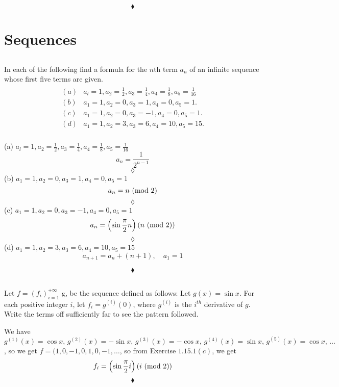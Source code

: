 $$\blacklozenge$$
\newpage
 \section{Sequences}
\subsection{}
\begin{tcolorbox}
In each of the following find a formula for the $n$th term $a_n$ of an infinite sequence whose first five terms are given. 
\begin{align*}
\begin{matrix}
(a)& a_l = 1, a_2 = \frac{1}{2}, a_3 = \frac{1}{4}, a_4 = \frac{1}{8}, a_5 =\frac{1}{16} \\
(b)& a_1= 1, a_2 = 0, a_3= 1, a_4= 0, a_5 = 1. \\
(c)& a_1= 1 , a_2 = 0, a_3= -1, a_4= 0, a_5 = 1. \\
(d)& a_1= 1, a_2 = 3, a_3= 6, a_4= 10, a_5 = 15. \\ 
\end{matrix}
\end{align*}
\end{tcolorbox}
$$ $$
(a) $ a_l = 1, a_2 = \frac{1}{2}, a_3 = \frac{1}{4}, a_4 = \frac{1}{8}, a_5 =\frac{1}{16}$ \\
$$a_n=\frac{1}{2^{n-1}}$$
$$\lozenge$$
(b) $ a_1= 1, a_2 = 0, a_3= 1, a_4= 0, a_5 = 1$ \\
$$a_n=n\ (\mathrm{mod}\ 2)$$
$$\lozenge$$
(c) $ a_1= 1 , a_2 = 0, a_3= -1, a_4= 0, a_5 = 1$ \\
$$a_n=\left(\sin \frac{\pi}{2}n\right)\left(n\ (\mathrm{mod}\ 2)\right)$$
$$\lozenge$$
(d) $ a_1= 1, a_2 = 3, a_3= 6, a_4= 10, a_5 = 15$ \\
$$a_{n+1}=a_{n}+ (n+1),\quad a_1=1$$

$$\blacklozenge$$

\subsection{}
\begin{tcolorbox}
Let $f= (f_i)_{i=1}^{+\infty}$  g, be the sequence defined as follows: Let $g(x) = \sin x$. For each positive integer $i$, let $f_i = g^{(i)}(0)$, where $g^{(i)}$ is the $i^{th}$ derivative of $g$. Write the terms off sufficiently far to see the pattern followed.
\end{tcolorbox}
$$ $$
We have $g^{(1)}(x)=\cos x,\,g^{(2)}(x)=-\sin x,\,g^{(3)}(x)=-\cos x,\,g^{(4)}(x)=\sin x,\,g^{(5)}(x)=\cos x,\,\dots$, so we get $f=(1,0,-1,0,1,0,-1,\dots$, so from Exercise $1.15.1(c)$, we get
$$f_i=\left(\sin \frac{\pi}{2}i\right)\left(i\ (\mathrm{mod}\ 2)\right)$$
$$\blacklozenge$$
\\

